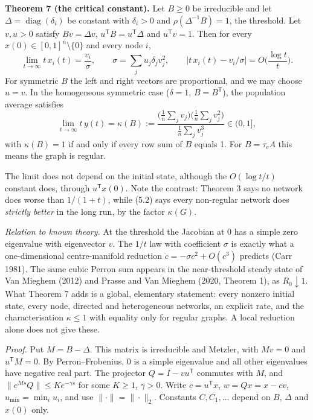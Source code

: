 \documentclass[
  11pt,
  a4paper,
]{article}
\begin{document}
\textbf{Theorem 7 (the critical constant).} Let \(B\ge0\) be irreducible
and let \(\Delta=\operatorname{diag}(\delta_i)\) be constant with
\(\delta_i>0\) and \(\rho(\Delta^{-1}B)=1\), the threshold. Let
\(v,u>0\) satisfy \(Bv=\Delta v\),
\(u^{\mathsf T}B=u^{\mathsf T}\Delta\) and \(u^{\mathsf T}v=1\). Then
for every \(x(0)\in[0,1]^n\setminus\{0\}\) and every node \(i\), \[
\lim_{t\to\infty}t\,x_i(t)=\frac{v_i}{\sigma},\qquad \sigma=\sum_ju_j\delta_jv_j^2,\qquad |t\,x_i(t)-v_i/\sigma|=O\Big(\frac{\log t}{t}\Big). \tag{5.1}
\] For symmetric \(B\) the left and right vectors are proportional, and
we may choose \(u=v\). In the homogeneous symmetric case (\(\delta=1\),
\(B=B^{\mathsf T}\)), the population average satisfies \[
\lim_{t\to\infty}t\,y(t)=\kappa(B):=\frac{\big(\frac1n\sum_jv_j\big)\big(\frac1n\sum_jv_j^2\big)}{\frac1n\sum_jv_j^3}\in(0,1], \tag{5.2}
\] with \(\kappa(B)=1\) if and only if every row sum of \(B\) equals 1.
For \(B=\tau_cA\) this means the graph is regular.

The limit does not depend on the initial state, although the
\(O(\log t/t)\) constant does, through \(u^{\mathsf T}x(0)\). Note the
contrast: Theorem 3 says no network does worse than \(1/(1+t)\), while
(5.2) says every non-regular network does \emph{strictly better} in the
long run, by the factor \(\kappa(G)\).

\emph{Relation to known theory.} At the threshold the Jacobian at \(0\)
has a simple zero eigenvalue with eigenvector \(v\). The \(1/t\) law
with coefficient \(\sigma\) is exactly what a one-dimensional
centre-manifold reduction \(\dot c=-\sigma c^2+O(c^3)\) predicts (Carr
1981). The same cubic Perron sum appears in the near-threshold steady
state of Van Mieghem (2012) and Prasse and Van Mieghem (2020, Theorem
1), as \(R_0\downarrow1\). What Theorem 7 adds is a global, elementary
statement: every nonzero initial state, every node, directed and
heterogeneous networks, an explicit rate, and the characterisation
\(\kappa\le1\) with equality only for regular graphs. A local reduction
alone does not give these.

\emph{Proof.} Put \(M=B-\Delta\). This matrix is irreducible and
Metzler, with \(Mv=0\) and \(u^{\mathsf T}M=0\). By Perron--Frobenius,
\(0\) is a simple eigenvalue and all other eigenvalues have negative
real part. The projector \(Q=I-vu^{\mathsf T}\) commutes with \(M\), and
\(\|e^{Ms}Q\|\le Ke^{-\gamma s}\) for some \(K\ge1\), \(\gamma>0\).
Write \(c=u^{\mathsf T}x\), \(w=Qx=x-cv\), \(u_{\min}=\min_iu_i\), and
use \(\|\cdot\|=\|\cdot\|_2\). Constants \(C,C_1,\dots\) depend on
\(B\), \(\Delta\) and \(x(0)\) only.
\end{document}
